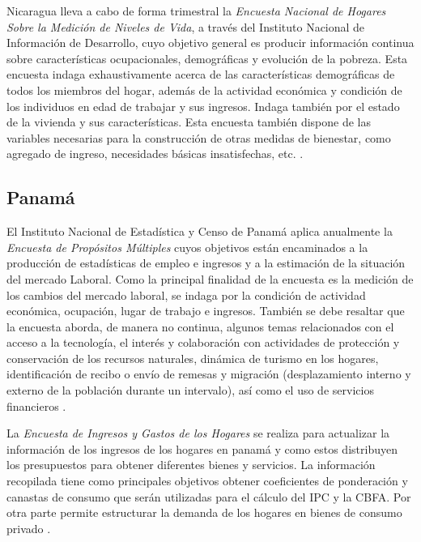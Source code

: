 \documentclass[12pt,spanish,]{book}
\begin{document}
Nicaragua lleva a cabo de forma trimestral la \emph{Encuesta Nacional de Hogares Sobre la Medición de Niveles de Vida}, a través del Instituto Nacional de Información de Desarrollo, cuyo objetivo general es producir información continua sobre características ocupacionales, demográficas y evolución de la pobreza. Esta encuesta indaga exhaustivamente acerca de las características demográficas de todos los miembros del hogar, además de la actividad económica y condición de los individuos en edad de trabajar y sus ingresos. Indaga también por el estado de la vivienda y sus características. Esta encuesta también dispone de las variables necesarias para la construcción de otras medidas de bienestar, como agregado de ingreso, necesidades básicas insatisfechas, etc. \autocite{INIDE-NI}.

\hypertarget{panama}{%
\subsection*{Panamá}\label{panama}}

El Instituto Nacional de Estadística y Censo de Panamá aplica anualmente la \emph{Encuesta de Propósitos Múltiples} cuyos objetivos están encaminados a la producción de estadísticas de empleo e ingresos y a la estimación de la situación del mercado Laboral. Como la principal finalidad de la encuesta es la medición de los cambios del mercado laboral, se indaga por la condición de actividad económica, ocupación, lugar de trabajo e ingresos. También se debe resaltar que la encuesta aborda, de manera no continua, algunos temas relacionados con el acceso a la tecnología, el interés y colaboración con actividades de protección y conservación de los recursos naturales, dinámica de turismo en los hogares, identificación de recibo o envío de remesas y migración (desplazamiento interno y externo de la población durante un intervalo), así como el uso de servicios financieros \autocite{INEC-PA}.

La \emph{Encuesta de Ingresos y Gastos de los Hogares} se realiza para actualizar la información de los ingresos de los hogares en panamá y como estos distribuyen los presupuestos para obtener diferentes bienes y servicios. La información recopilada tiene como principales objetivos obtener coeficientes de ponderación y canastas de consumo que serán utilizadas para el cálculo del IPC y la CBFA. Por otra parte permite estructurar la demanda de los hogares en bienes de consumo privado \autocite{INEC2-PA}.
\end{document}
